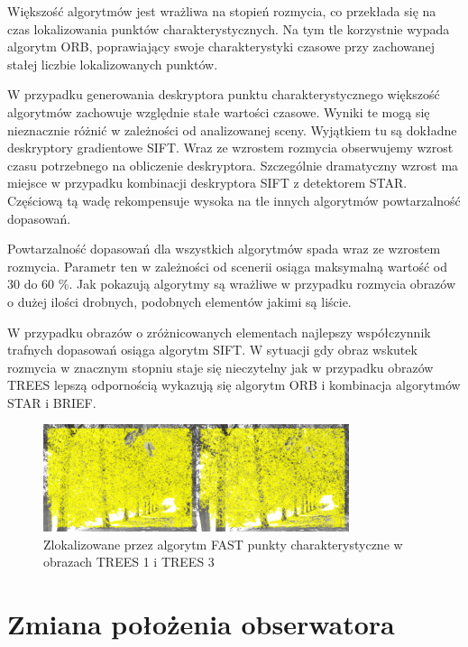 Większość algorytmów jest wrażliwa na stopień rozmycia, co przekłada się na czas lokalizowania punktów charakterystycznych. Na tym tle korzystnie wypada algorytm ORB, poprawiający swoje charakterystyki czasowe przy zachowanej stałej liczbie lokalizowanych punktów.

W przypadku generowania deskryptora punktu charakterystycznego większość algorytmów zachowuje względnie stałe wartości czasowe. Wyniki te mogą się nieznacznie różnić w zależności od analizowanej sceny. Wyjątkiem tu są dokładne deskryptory gradientowe SIFT. Wraz ze wzrostem rozmycia obserwujemy wzrost czasu potrzebnego na obliczenie deskryptora. Szczególnie dramatyczny wzrost ma miejsce w przypadku kombinacji deskryptora SIFT z detektorem STAR. Częściową tą wadę rekompensuje wysoka na tle innych algorytmów powtarzalność dopasowań.

Powtarzalność dopasowań dla wszystkich algorytmów spada wraz ze wzrostem rozmycia. Parametr ten w zależności od scenerii osiąga maksymalną wartość od 30 do 60 \%. Jak pokazują algorytmy są wrażliwe w przypadku rozmycia obrazów o dużej ilości drobnych, podobnych elementów jakimi są liście.

W przypadku obrazów o zróżnicowanych elementach najlepszy współczynnik trafnych dopasowań osiąga algorytm SIFT. W sytuacji gdy obraz wskutek rozmycia w znacznym stopniu staje się nieczytelny jak w przypadku obrazów TREES lepszą odpornością wykazują się algorytm ORB i kombinacja algorytmów STAR i BRIEF.







\begin{figure}
\centering
\includegraphics[width=0.8\textwidth]{pict/badania/trees_fast_1_3.png}
\caption{Zlokalizowane przez algorytm FAST punkty charakterystyczne w obrazach TREES 1 i TREES 3}
\label{tt13}
\end{figure}





\FloatBarrier
\section{Zmiana położenia obserwatora}
\FloatBarrier
